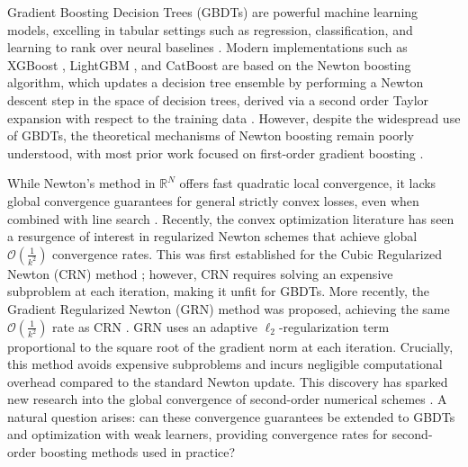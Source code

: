\documentclass{article}
\theoremstyle{plain}
\theoremstyle{definition}
\theoremstyle{remark}
\begin{document}
Gradient Boosting Decision Trees (GBDTs) are powerful machine learning models, excelling in tabular settings such as regression, classification, and learning to rank over neural baselines \cite{
2021AreNeuralRankersStillOutperformedByGradientBoostedDecisionTrees,
2022WhyDoTreesOutperformDeepLearningTabularData,
2023WhenDoNeuralNetsOutperformBoostedTreesOnTabularData,
2025TabArenaBenchmarkTabularData}. Modern implementations such as XGBoost \cite{2016XGBoost}, LightGBM \cite{2017LightGBM}, and CatBoost \cite{2018CatBoost} are based on the Newton boosting algorithm, which updates a decision tree ensemble by performing a Newton descent step in the space of decision trees, derived via a second order Taylor expansion with respect to the training data \cite{2016XGBoost}. However, despite the widespread use of GBDTs, the theoretical mechanisms of Newton boosting remain poorly understood, with most prior work focused on first-order gradient boosting \cite{1999BoostingAlgorithmsAsGradientDescent,
2001GreedyFunctionApproximationAGradientBoostingMachine,
2011GeneralizedBoostingAlgorithmsForConvexOptimization,
2017ANewPerspectiveOnBoostingInLinearRegressionViaSubgradientOptimization,
2019RegularizedGradientBoosting,
2020RandomizedGradientBoostingMachine,
2020AcceleratingGradientBoostingMachines}.


While Newton's method in $\mathbb{R}^N$ offers fast quadratic local convergence, it lacks global convergence guarantees for general strictly convex losses, even when combined with line search \cite{2016SimpleExamplesForTheFailureOfNewtonsMethodWithLineSearchForStrictlyConvexMinimization}. Recently, the convex optimization literature has seen a resurgence of interest in regularized Newton schemes that achieve global $\mathcal{O}(\frac{1}{k^2})$ convergence rates. This was first established for the Cubic Regularized Newton (CRN) method \cite{2006CubicRegularizationOfNewtonMethodAndItsGlobalPerformance, 2008AcceleratingTheCubicRegularizationOfNewtonsMethodOnConvexProblems}; however, CRN requires solving an expensive subproblem at each iteration, making it unfit for GBDTs. More recently, the Gradient Regularized Newton (GRN) method was proposed, achieving the same $\mathcal{O}(\frac{1}{k^2})$ rate as CRN \cite{2023RegularizedNewtonMethodWithGlobalConvergence, 2024GradientRegularizationOfNewtonMethodWithBregmanDistances}. GRN uses an adaptive $\ell_2$-regularization term proportional to the square root of the gradient norm at each iteration. Crucially, this method avoids expensive subproblems and incurs negligible computational overhead compared to the standard Newton update. This discovery has sparked new research into the global convergence of second-order numerical schemes \cite{2022ADampedNewtonMethodAchievesGlobalMinus2AndLocalQuadraticConvergenceRate, 2024SuperUniversalRegularizedNewtonMethod, 2025MinimizingQuasiSelfConcordantFunctionsByGradientRegularizationOfNewtonMethod, 2025SketchAndProjectMeetsNewtonMethodGlobalConvergenceWithLowRankUpdates}. A natural question arises: can these convergence guarantees be extended to GBDTs and optimization with weak learners, providing convergence rates for second-order boosting methods used in practice?
 		
\end{document}
